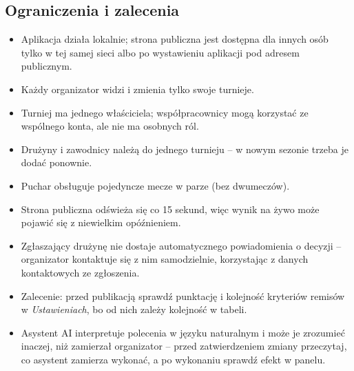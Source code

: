 \documentclass[11pt,a4paper,oneside]{article}
\newif\ifpodpowiedzi
\newcommand{\podpowiedz}[1]{\ifpodpowiedzi\par\begingroup\small\color{hintcolor}\textit{Wskazówka: #1}\par\endgroup\fi}
\begin{document}
\subsection{Ograniczenia i zalecenia}
\podpowiedz{Wskaż ograniczenia mające wpływ na korzystanie z projektu oraz praktyczne zalecenia. Jeśli użytkownik korzysta z funkcji AI, wyjaśnij charakter wyników, ich ograniczenia i potrzebę weryfikacji tam, gdzie ma to znaczenie. Nie dodawaj informacji o AI, jeśli nie jest częścią rozwiązania i nie wpływa na użytkowanie.}
\begin{itemize}
\item Aplikacja działa lokalnie; strona publiczna jest dostępna dla innych osób tylko w tej samej sieci albo po wystawieniu aplikacji pod adresem publicznym.
\item Każdy organizator widzi i zmienia tylko swoje turnieje.
\item Turniej ma jednego właściciela; współpracownicy mogą korzystać ze wspólnego konta, ale nie ma osobnych ról.
\item Drużyny i zawodnicy należą do jednego turnieju -- w nowym sezonie trzeba je dodać ponownie.
\item Puchar obsługuje pojedyncze mecze w parze (bez dwumeczów).
\item Strona publiczna odświeża się co 15 sekund, więc wynik na żywo może pojawić się z niewielkim opóźnieniem.
\item Zgłaszający drużynę nie dostaje automatycznego powiadomienia o decyzji -- organizator kontaktuje się z nim samodzielnie, korzystając z danych kontaktowych ze zgłoszenia.
\item Zalecenie: przed publikacją sprawdź punktację i kolejność kryteriów remisów w \emph{Ustawieniach}, bo od nich zależy kolejność w tabeli.
\item Asystent AI interpretuje polecenia w języku naturalnym i może je zrozumieć inaczej, niż zamierzał organizator -- przed zatwierdzeniem zmiany przeczytaj, co asystent zamierza wykonać, a po wykonaniu sprawdź efekt w panelu.
\end{itemize}
\end{document}
